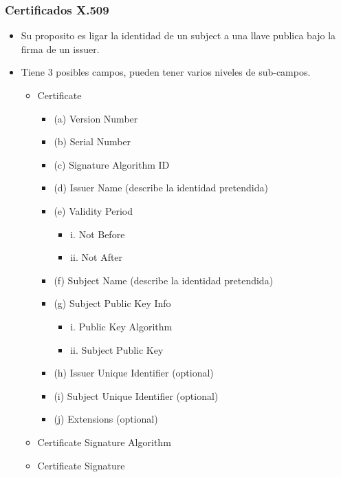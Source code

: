 \documentclass[11pt]{article}
\begin{document}
\subsubsection{Certificados X.509}
\label{sec:orgcd8860c}
\begin{itemize}
\item Su proposito es ligar la identidad de un subject a una llave publica bajo la firma de un issuer.

\item Tiene 3 posibles campos, pueden tener varios niveles de sub-campos.
\begin{itemize}
\item Certificate
\begin{itemize}
\item (a) Version Number
\item (b) Serial Number
\item (c) Signature Algorithm ID
\item (d) Issuer Name (describe la identidad pretendida)
\item (e) Validity Period
\begin{itemize}
\item i. Not Before
\item ii. Not After
\end{itemize}
\item (f) Subject Name (describe la identidad pretendida)
\item (g) Subject Public Key Info
\begin{itemize}
\item i. Public Key Algorithm
\item ii. Subject Public Key
\end{itemize}
\item (h) Issuer Unique Identifier (optional)
\item (i) Subject Unique Identifier (optional)
\item (j) Extensions (optional)
\end{itemize}
\item Certificate Signature Algorithm
\item Certificate Signature
\end{itemize}


\end{itemize}
\end{document}
